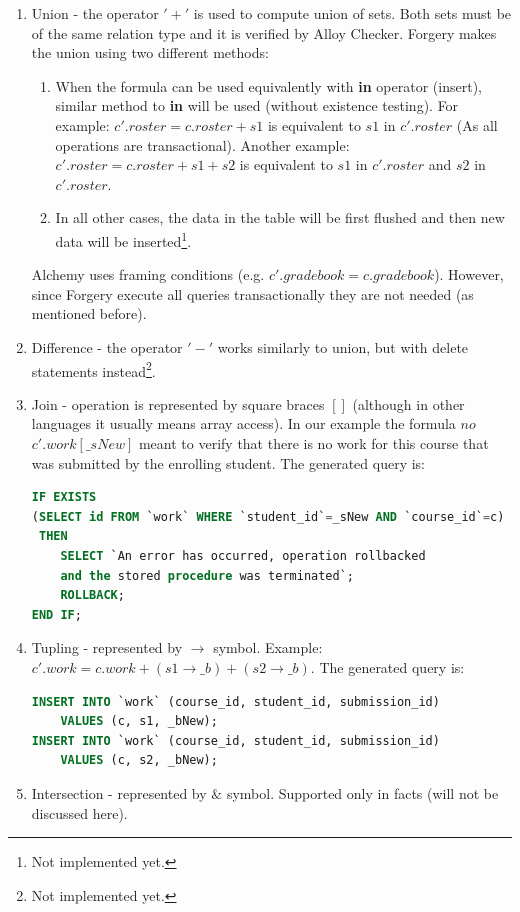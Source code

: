 \documentclass[oneside]{book}
\begin{document}
\begin{enumerate}
\item Union - the operator $'+'$ is used to compute union of sets. Both sets must be of the same relation type and it is verified by Alloy Checker. Forgery makes the union using two different methods:

\begin{enumerate}
\item When the formula can be used equivalently with \textbf{in} operator (insert), similar method to \textbf{in} will be used (without existence testing). For example: $c'.roster = c.roster + s1$ is equivalent to $s1$ in $c'.roster$ (As all operations are transactional). Another example: $c'.roster = c.roster + s1 + s2$ is equivalent to $s1$ in $c'.roster$ and $s2$ in $c'.roster$.\\

\item In all other cases, the data in the table will be first flushed and then new data will be inserted\footnote{Not implemented yet.}.\\
\end{enumerate}

\noindent Alchemy uses framing conditions (e.g. $c'.gradebook = c.gradebook$). However, since Forgery execute all queries transactionally they are not needed (as mentioned before).\\

\item Difference - the operator $'-'$ works similarly to union, but with delete statements instead\footnote{Not implemented yet.}.\\

\item Join - operation is represented by square braces $[]$ (although in other languages it usually means array access). In our example the formula $no$ $c'.work [\_sNew]$ meant to verify that there is no work for this course that was submitted by the enrolling student. The generated query is:
\begin{lstlisting}[escapechar=@,language=SQL]
IF EXISTS
(SELECT id FROM `work` WHERE `student_id`=_sNew AND `course_id`=c)
 THEN
	SELECT `An error has occurred, operation rollbacked 
	and the stored procedure was terminated`;
	ROLLBACK;
END IF;
\end{lstlisting}

\item Tupling - represented by $\rightarrow$ symbol. Example: $c'.work = c.work + (s1 \rightarrow \_b) + (s2 \rightarrow \_b)$. The generated query is:
\begin{lstlisting}[escapechar=@,language=SQL]
INSERT INTO `work` (course_id, student_id, submission_id) 
	VALUES (c, s1, _bNew);
INSERT INTO `work` (course_id, student_id, submission_id) 
	VALUES (c, s2, _bNew);
\end{lstlisting}

\item Intersection - represented by $\&$ symbol. Supported only in facts (will not be discussed here).\\
\end{enumerate}
\end{document}

